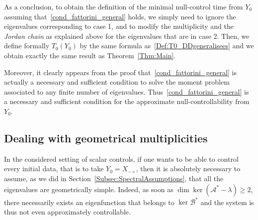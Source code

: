 \documentclass[11pt]{article}
\theoremstyle{definition}
\numberwithin{equation}{section}
\numberwithin{figure}{section}
\numberwithin{table}{section}
\newcommand\As{\mathcal{A}^*}
\newcommand\Bs{\mathcal{B}^*}
\newcommand{\Xmalpha}{X_{-\diamond}}
\newcommand{\Fzp}{Y_0}
\begin{document}
As a conclusion, to obtain the definition of the minimal null-control time from $\Fzp$ assuming that~\eqref{cond_fattorini_general} holds, we simply need to ignore the eigenvalues corresponding to case 1, and to modify the multiplicity and the {\em Jordan chain} as explained above for the eigenvalues that are in case 2. Then, we define formally $T_0(\Fzp)$ by the same formula as~\eqref{Def:T0_DDgeneralisees} and we obtain exactly the same result as Theorem~\ref{Thm:Main}.

Moreover, it clearly appears from the proof that~\eqref{cond_fattorini_general} is actually a necessary and sufficient condition to solve the moment problem associated to any finite number of eigenvalues. Thus~\eqref{cond_fattorini_general} is a necessary and sufficient condition for the approximate null-controllability from $\Fzp$.



\subsection{Dealing with geometrical multiplicities} \label{Subsec:MultipliciteGeo}

In the considered setting of scalar controls, if one wants to be able to control every initial data, that is to take $\Fzp=\Xmalpha$, then it is absolutely necessary to assume, as we did in Section~\ref{Subsec:SpectralAssumptions}, that all the eigenvalues are geometrically simple. Indeed, as soon as $\dim \ker(\As-\lambda)\geq 2$, there necessarily exists an eigenfunction that belongs to $\ker \Bs$ and the system is thus not even approximately controllable.
\end{document}
